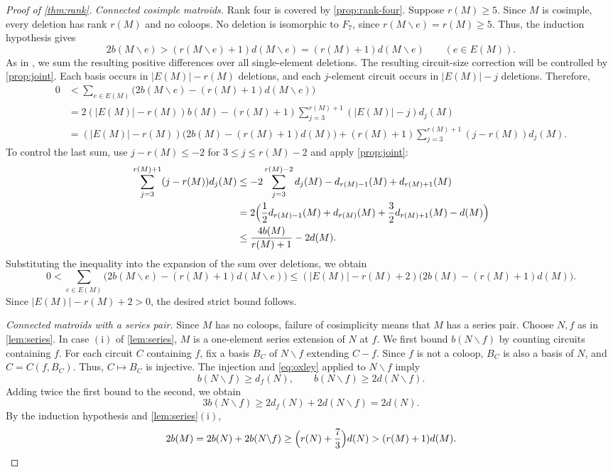 \documentclass[10pt,a4paper]{article}
\numberwithin{equation}{section}
\begin{document}
\begin{proof}[Proof of \autoref{thm:rank}]
\emph{Connected cosimple matroids.}
Rank four is covered by \autoref{prop:rank-four}.
Suppose \(r(M)\ge5\).
Since \(M\) is cosimple, every deletion has rank \(r(M)\)
and no coloops.
No deletion is isomorphic to \(F_7\), since
\(r(M\backslash e)=r(M)\ge5\). Thus, the induction hypothesis gives
\[
 2b(M\backslash e)>(r(M\backslash e)+1)d(M\backslash e)
 =(r(M)+1)d(M\backslash e)\qquad(e\in E(M)).
\]
As in \cite[proof of Theorem~3.1, pp.~176--177]{Oxley1983},
we sum the resulting positive differences over all single-element deletions.
The resulting circuit-size correction will be controlled by
\autoref{prop:joint}.
Each basis occurs in \(|E(M)|-r(M)\) deletions, and each
\(j\)-element circuit occurs in \(|E(M)|-j\) deletions.
Therefore,
\begin{align*}
 0&<\sum_{e\in E(M)}
 \bigl(2b(M\backslash e)-(r(M)+1)d(M\backslash e)\bigr)\\
 &=2(|E(M)|-r(M))b(M)
 -(r(M)+1)\sum_{j=3}^{r(M)+1}(|E(M)|-j)d_j(M)\\
 &=(|E(M)|-r(M))\bigl(2b(M)-(r(M)+1)d(M)\bigr)+(r(M)+1)\sum_{j=3}^{r(M)+1}(j-r(M))d_j(M).
\end{align*}
To control the last sum, use \(j-r(M)\le-2\) for
\(3\le j\le r(M)-2\) and apply \autoref{prop:joint}:
\begin{align*}
 \sum_{j=3}^{r(M)+1}(j-r(M))d_j(M)
 &\le -2\sum_{j=3}^{r(M)-2}d_j(M)-d_{r(M)-1}(M)+d_{r(M)+1}(M)\\
 &=2\Bigl(\frac12d_{r(M)-1}(M)+d_{r(M)}(M)
          +\frac32d_{r(M)+1}(M)-d(M)\Bigr)\\
 &\le\frac{4b(M)}{r(M)+1}-2d(M).
\end{align*}
Substituting the inequality into the expansion of the sum over deletions, we obtain
\[
 0<\sum_{e\in E(M)}\bigl(2b(M\backslash e)-(r(M)+1)d(M\backslash e)\bigr)\le(|E(M)|-r(M)+2)\bigl(2b(M)-(r(M)+1)d(M)\bigr).
\]
Since \(|E(M)|-r(M)+2>0\), the desired strict bound follows.

\emph{Connected matroids with a series pair.}
Since \(M\) has no coloops, failure of cosimplicity means that
\(M\) has a series pair.
Choose \(N,f\) as in \autoref{lem:series}.
In case \(\mathrm{(i)}\) of \autoref{lem:series}, \(M\) is a
one-element series extension of \(N\) at \(f\).
We first bound \(b(N\backslash f)\) by counting circuits containing \(f\).
For each circuit \(C\) containing \(f\), fix a basis \(B_C\)
of \(N\backslash f\) extending \(C-f\).
Since \(f\) is not a coloop, \(B_C\) is also a basis of \(N\),
and \(C=C(f,B_C)\). Thus, \(C\mapsto B_C\) is injective.
The injection and \eqref{eq:oxley} applied to \(N\backslash f\) imply
\[
 b(N\backslash f)\ge d_f(N),\qquad
 b(N\backslash f)\ge2d(N\backslash f).
\]
Adding twice the first bound to the second, we obtain
\[
 3b(N\backslash f)\ge2d_f(N)+2d(N\backslash f)=2d(N).
\]
By the induction hypothesis and \autoref{lem:series}\(\mathrm{(i)}\),
\[
 2b(M)=2b(N)+2b(N\backslash f)
 \ge\Bigl(r(N)+\frac73\Bigr)d(N)
 >(r(M)+1)d(M).
\]


\end{proof}
\end{document}
